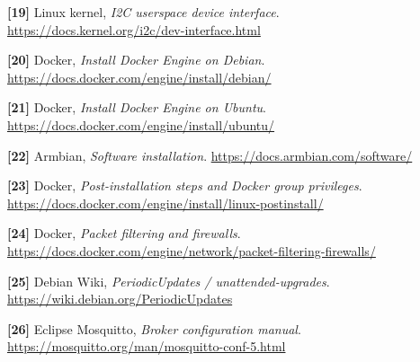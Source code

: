 \documentclass[10pt,oneside,openany]{report}
\begin{document}
\noindent\textbf{[19]} Linux kernel, \emph{I2C userspace device interface}. \url{https://docs.kernel.org/i2c/dev-interface.html}

\noindent\textbf{[20]} Docker, \emph{Install Docker Engine on Debian}. \url{https://docs.docker.com/engine/install/debian/}

\noindent\textbf{[21]} Docker, \emph{Install Docker Engine on Ubuntu}. \url{https://docs.docker.com/engine/install/ubuntu/}

\noindent\textbf{[22]} Armbian, \emph{Software installation}. \url{https://docs.armbian.com/software/}

\noindent\textbf{[23]} Docker, \emph{Post-installation steps and Docker group privileges}. \url{https://docs.docker.com/engine/install/linux-postinstall/}

\noindent\textbf{[24]} Docker, \emph{Packet filtering and firewalls}. \url{https://docs.docker.com/engine/network/packet-filtering-firewalls/}

\noindent\textbf{[25]} Debian Wiki, \emph{PeriodicUpdates / unattended-upgrades}. \url{https://wiki.debian.org/PeriodicUpdates}

\noindent\textbf{[26]} Eclipse Mosquitto, \emph{Broker configuration manual}. \url{https://mosquitto.org/man/mosquitto-conf-5.html}
\endgroup
\end{document}
